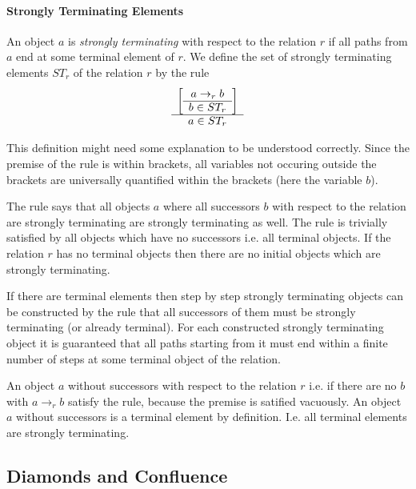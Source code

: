 \paragraph{Strongly Terminating Elements}

\begin{definition}
  An object $a$ is \emph{strongly terminating} with respect to the relation
  $r$ if all paths from $a$ end at some terminal element of $r$. We define the
  set of strongly terminating elements $ST_r$ of the relation $r$ by the rule
%
$$
   \begin{array}{c} 
     \begin{bmatrix}
       \begin{array}{c} a \to_r b \\ \hline b \in ST_r\end{array}
     \end{bmatrix}
    \\ \hline a \in ST_r\end{array}
$$
\end{definition}

This definition might need some explanation to be understood correctly. Since
the premise of the rule is within brackets, all variables not occuring outside
the brackets are universally quantified within the brackets (here the variable
$b$).

The rule says that all objects $a$ where all successors $b$ with respect to
the relation are strongly terminating are strongly terminating as well. The
rule is trivially satisfied by all objects which have no successors i.e. all
terminal objects. If the relation $r$ has no terminal objects then there
are no initial objects which are strongly terminating.

If there are terminal elements then step by step strongly terminating objects
can be constructed by the rule that all successors of them must be strongly
terminating (or already terminal). For each constructed strongly terminating
object it is guaranteed that all paths starting from it must end within a finite
number of steps at some terminal object of the relation.




An object $a$ without successors with respect to the relation $r$ i.e. if
there are no $b$ with $a \to_r b$ satisfy the rule, because the premise is
satified vacuously. An object $a$ without successors is a terminal element by
definition. I.e. all terminal elements are strongly terminating.










\subsection{Diamonds and Confluence}
\label{sec:diamondsconfluence}

